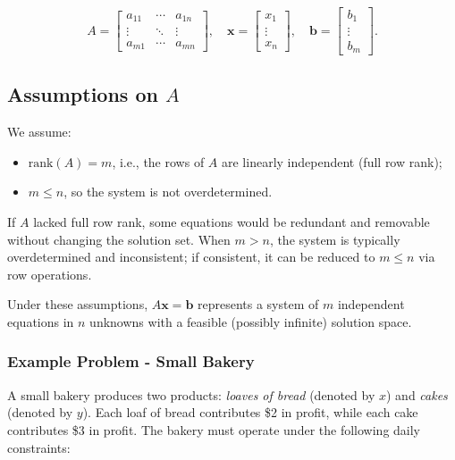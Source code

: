$$
A =
\begin{bmatrix}
    a_{11} & \cdots & a_{1n} \\
    \vdots & \ddots & \vdots \\
    a_{m1} & \cdots & a_{mn}
\end{bmatrix}, \quad
\mathbf{x} =
\begin{bmatrix}
    x_1 \\
    \vdots \\
    x_n
\end{bmatrix}, \quad
\mathbf{b} =
\begin{bmatrix}
    b_1 \\
    \vdots \\
    b_m
\end{bmatrix}.
$$

\subsection*{Assumptions on $A$}

We assume:
\begin{itemize}
\item $\text{rank}(A) = m$, i.e., the rows of $A$ are linearly independent (full row rank);
\item $m \leq n$, so the system is not overdetermined.
\end{itemize}

If $A$ lacked full row rank, some equations would be redundant and removable without changing the solution set. When $m > n$, the system is typically overdetermined and inconsistent; if consistent, it can be reduced to $m \leq n$ via row operations.

Under these assumptions, $A\mathbf{x} = \mathbf{b}$ represents a system of $m$ independent equations in $n$ unknowns with a feasible (possibly infinite) solution space.

\subsubsection{Example Problem - Small Bakery}
\label{sec:bakery-problem}

A small bakery produces two products: \emph{loaves of bread} (denoted by \(x\)) and \emph{cakes} (denoted by \(y\)). Each loaf of bread contributes \$2 in profit, while each cake contributes \$3 in profit. The bakery must operate under the following daily constraints:

